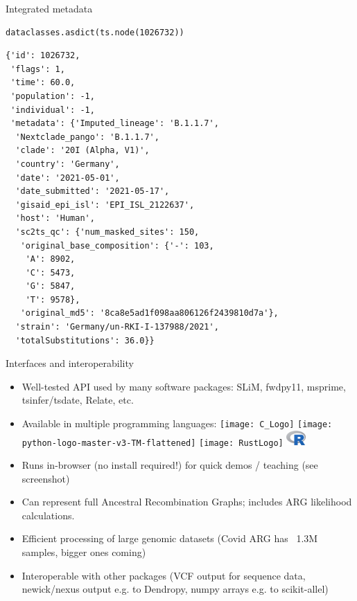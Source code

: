 \documentclass[landscape,a0paper,fontscale=0.4]{baposter}
\newcommand{\compresslist}{%
 \setlength{\itemsep}{1pt}%
 \setlength{\parskip}{0pt}%
 \setlength{\parsep}{0pt}%
 }
\begin{document}
\begin{poster}
\begin{posterbox}[name=inout,column=0,span=1]{Integrated metadata}
\begin{verbatim}
dataclasses.asdict(ts.node(1026732))
\end{verbatim}
\tiny
\begin{verbatim}
{'id': 1026732,
 'flags': 1,
 'time': 60.0,
 'population': -1,
 'individual': -1,
 'metadata': {'Imputed_lineage': 'B.1.1.7',
  'Nextclade_pango': 'B.1.1.7',
  'clade': '20I (Alpha, V1)',
  'country': 'Germany',
  'date': '2021-05-01',
  'date_submitted': '2021-05-17',
  'gisaid_epi_isl': 'EPI_ISL_2122637',
  'host': 'Human',
  'sc2ts_qc': {'num_masked_sites': 150,
   'original_base_composition': {'-': 103,
    'A': 8902,
    'C': 5473,
    'G': 5847,
    'T': 9578},
   'original_md5': '8ca8e5ad1f098aa806126f2439810d7a'},
  'strain': 'Germany/un-RKI-I-137988/2021',
  'totalSubstitutions': 36.0}}
\end{verbatim}

\end{posterbox}

\begin{posterbox}[name=interop,column=0,row=0,span=1,below=inout]{Interfaces and interoperability}

\begin{itemize} \compresslist
    \item Well-tested API used by many software packages: SLiM, fwdpy11, msprime, tsinfer/tsdate, Relate, etc.
    \item Available in multiple programming languages:
        \texttt{[image: C\_Logo]}
        \texttt{[image: python-logo-master-v3-TM-flattened]}
        \texttt{[image: RustLogo]}
        \includegraphics[width=2em]{R-logo}
    \item Runs in-browser (no install required!) for quick demos / teaching (see screenshot)
    \item Can represent full Ancestral Recombination Graphs; includes ARG likelihood calculations.
    \item Efficient processing of large genomic datasets (Covid ARG has ~1.3M samples, bigger ones coming)
    \item Interoperable with other packages (VCF output for sequence data, newick/nexus output e.g. to Dendropy, numpy arrays e.g. to scikit-allel)
\end{itemize}


\end{posterbox}
\end{poster}
\end{document}
